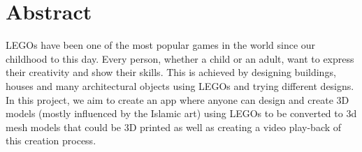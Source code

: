 \chapter*{Abstract}
\label{chap:abstract}

LEGOs have been one of the most popular games in the world since our childhood to this day. Every person, whether a child or an adult, want to express their creativity and show their skills. This is achieved by designing buildings, houses and many architectural objects using LEGOs and trying different designs. In this project, we aim to create an app where anyone can design and create 3D models (mostly influenced by the Islamic art) using LEGOs to be converted to 3d mesh models that could be 3D printed as well as creating a video play-back of this creation process. 